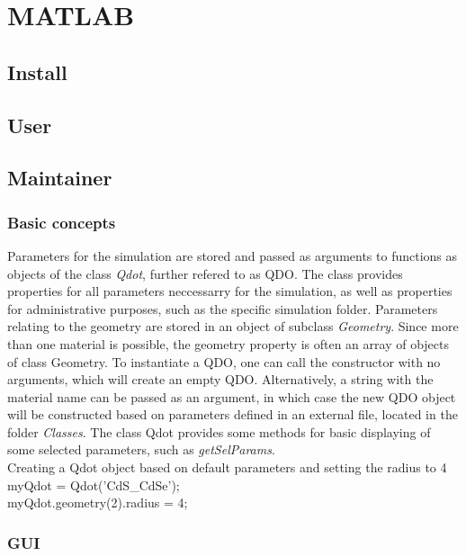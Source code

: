 \chapter{MATLAB}

\section{Install}
\section{User}
\section{Maintainer}

\subsection{Basic concepts}
Parameters for the simulation are stored and passed as arguments to functions as objects of the class \textit{Qdot}, further refered to as QDO. The class provides properties for all parameters neccessarry for the simulation, as well as properties for administrative purposes, such as the specific simulation folder. Parameters relating to the geometry are stored in an object of subclass \textit{Geometry}. Since more than one material is possible, the geometry property is often an array of objects of class Geometry. 
To instantiate a QDO, one can call the constructor with no arguments, which will create an empty QDO. Alternatively, a string with the material name can be passed as an argument, in which case the new QDO object will be constructed based on parameters defined in an external file, located in the folder \textit{Classes}.
The class Qdot provides some methods for basic displaying of some selected parameters, such as \textit{getSelParams}.\\

Creating a Qdot object based on default parameters and setting the radius to 4\\
myQdot = Qdot('CdS\_CdSe');\\
myQdot.geometry(2).radius = 4;\\




\subsection{GUI}
